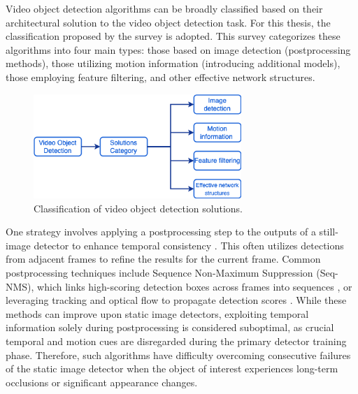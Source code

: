
Video object detection algorithms can be broadly classified based on their architectural solution to the video object detection task. For this thesis, the classification proposed by the survey \cite{jiaoNewGenerationDeep2022} is adopted. This survey categorizes these algorithms into four main types: those based on image detection (postprocessing methods), those utilizing motion information (introducing additional models), those employing feature filtering, and other effective network structures.

\begin{figure}
    \centering
    \includegraphics[width=0.7\textwidth]{figures/figure_background_vod_classification.png}
    \caption{Classification of video object detection solutions.}
\label{fig:figure_background_vod_classification}
\end{figure}

One strategy involves applying a postprocessing step to the outputs of a still-image detector to enhance temporal consistency \cite{hanSeqNMSVideoObject2016, kangTCNNTubeletsConvolutional2018, kangObjectDetectionVideo2016}. This often utilizes detections from adjacent frames to refine the results for the current frame. Common postprocessing techniques include Sequence Non-Maximum Suppression (Seq-NMS), which links high-scoring detection boxes across frames into sequences \cite{hanSeqNMSVideoObject2016}, or leveraging tracking and optical flow to propagate detection scores \cite{kangTCNNTubeletsConvolutional2018, kangObjectDetectionVideo2016}. While these methods can improve upon static image detectors, exploiting temporal information solely during postprocessing is considered suboptimal, as crucial temporal and motion cues are disregarded during the primary detector training phase. Therefore, such algorithms have difficulty overcoming consecutive failures of the static image detector when the object of interest experiences long-term occlusions or significant appearance changes.

